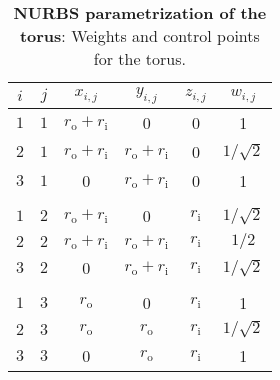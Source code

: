 \begin{table}
	\centering
	\caption{\textbf{NURBS parametrization of the torus}: Weights and control points for the torus.}
	\label{Tab3:torus}
	\begin{tabular}{c c c c c c}
		\toprule
		$i$		& 	$j$	& 	$x_{i,j}$ 	& $y_{i,j}$ 	& $z_{i,j}$ 	& $w_{i,j}$\\
		\hline
		$1$		&	$1$	&	$r_{\mathrm{o}}+r_{\mathrm{i}}$	& 0		& 0		&	1				\\
		$2$		&	$1$	&	$r_{\mathrm{o}}+r_{\mathrm{i}}$	& $r_{\mathrm{o}}+r_{\mathrm{i}}$		& 0 	&	$1/\sqrt{2}$	\\
		$3$		&	$1$	&	0	& $r_{\mathrm{o}}+r_{\mathrm{i}}$		& 0		&	1				\\ \\
		
		$1$		&	$2$	&	$r_{\mathrm{o}}+r_{\mathrm{i}}$	& 0		& $r_{\mathrm{i}}$		&	$1/\sqrt{2}$				\\
		$2$		&	$2$	&	$r_{\mathrm{o}}+r_{\mathrm{i}}$	& $r_{\mathrm{o}}+r_{\mathrm{i}}$		& $r_{\mathrm{i}}$ 	&	$1/2$	\\
		$3$		&	$2$	&	0	& $r_{\mathrm{o}}+r_{\mathrm{i}}$		& $r_{\mathrm{i}}$		&	$1/\sqrt{2}$				\\ \\
		
		$1$		&	$3$	&	$r_{\mathrm{o}}$	& 0		& $r_{\mathrm{i}}$		&	1				\\
		$2$		&	$3$	&	$r_{\mathrm{o}}$	& $r_{\mathrm{o}}$		& $r_{\mathrm{i}}$ 	&	$1/\sqrt{2}$	\\
		$3$		&	$3$	&	0	& $r_{\mathrm{o}}$	& $r_{\mathrm{i}}$		&	1				\\
		\bottomrule
	\end{tabular}
\end{table}